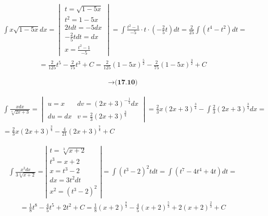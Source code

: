 
\begin{gather*}\int x\sqrt{1-5x}dx = \begin{vmatrix} t=\sqrt{1-5x} \\ t^2=1-5x \\ 2tdt=-5dx \\ -\frac{2}{5}tdt=dx \\ x=\frac{t^2-1}{-5} \end{vmatrix} = \int \frac{t^2-1}{-5} \cdot t \cdot \left( -\frac{2}{5}t \right) dt = \frac{2}{25} \int (t^4-t^2)dt = \end{gather*}
\begin{gather*}=  \frac{2}{125}t^5-\frac{2}{75}t^3+C = \frac{2}{125}(1-5x)^{\frac{5}{2}} - \frac{2}{75}(1-5x)^{\frac{3}{2}}+C\end{gather*}


\begin{gather*} \to \textbf{(17.10)} \end{gather*}


\begin{gather*} \nonumber \int \frac{xdx}{\sqrt[4]{2x+3}} = \begin{vmatrix}
u=x & dv=(2x+3)^{-\frac{1}{4}}dx \\
du=dx & v=\frac{2}{3}(2x+3)^{\frac{3}{4}}
\end{vmatrix} = \frac{2}{3}x(2x+3)^{\frac{3}{4}} - \int \frac{2}{3}(2x+3)^{\frac{3}{4}}dx = \\ = \frac{2}{3}x(2x+3)^{\frac{3}{4}} - \frac{4}{21}(2x+3)^{\frac{7}{4}}+C\end{gather*}



\begin{gather*}\int \frac{x^2dx}{3\sqrt[3]{x+2}} = \left| \begin{array}{l} t=\sqrt[3]{x+2} \\ t^3=x+2 \\ x=t^3-2 \\ dx=3t^2dt \\ x^2=(t^3-2)^2 \end{array} \right| = \int (t^3-2)^2tdt = \int (t^7-4t^4+4t)dt = \end{gather*}
\begin{gather*}= \frac{1}{8}t^8-\frac{4}{5}t^5+2t^2+C = \frac{1}{8}(x+2)^{\frac{8}{3}}-\frac{4}{5}(x+2)^{\frac{5}{3}}+2(x+2)^{\frac{2}{3}}+C\end{gather*}


